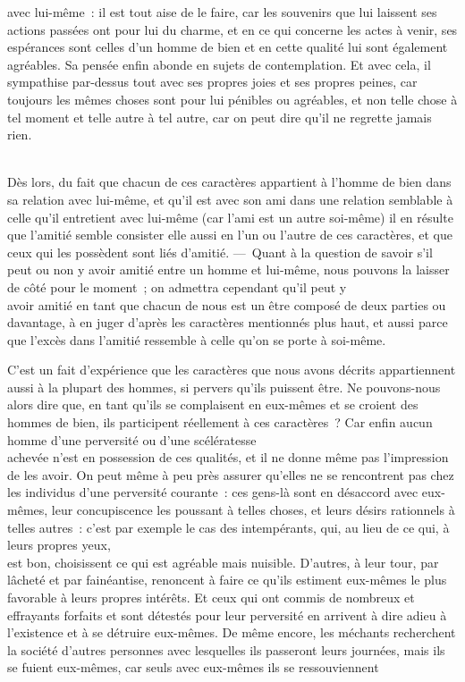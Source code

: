 \documentclass[french,twoside]{book} %
\begin{document}
avec lui-même : il est tout aise de le faire, car les souvenirs que lui laissent ses actions passées ont pour lui du charme, et en ce qui concerne les actes à venir, ses espérances sont celles d’un homme de bien et en cette qualité lui sont également agréables. Sa pensée enfin abonde en sujets de contemplation. Et avec cela, il sympathise par-dessus tout avec ses propres joies et ses propres peines, car toujours les mêmes choses sont pour lui pénibles ou agréables, et non telle chose à tel moment et telle autre à tel autre, car on peut dire qu’il ne regrette jamais rien.\par
\\
Dès lors, du fait que chacun de ces caractères appartient à l’homme de bien dans sa relation avec lui-même, et qu’il est avec son ami dans une relation semblable à celle qu’il entretient avec lui-même (car l’ami est un autre soi-même) il en résulte que l’amitié semble consister elle aussi en l’un ou l’autre de ces caractères, et que ceux qui les possèdent sont liés d’amitié. — Quant à la question de savoir s’il peut ou non y avoir amitié entre un homme et lui-même, nous pouvons la laisser de côté pour le moment ; on admettra cependant qu’il peut y \\
avoir amitié en tant que chacun de nous est un être composé de deux parties ou davantage, à en juger d’après les caractères  mentionnés plus haut, et aussi parce que l’excès dans l’amitié ressemble à celle qu’on se porte à soi-même.\par
C’est un fait d’expérience que les caractères que nous avons décrits appartiennent aussi à la plupart des hommes, si pervers qu’ils puissent être. Ne pouvons-nous alors dire que, en tant qu’ils se complaisent en eux-mêmes et se croient des hommes de bien, ils participent réellement à ces caractères ? Car enfin aucun homme d’une perversité ou d’une scélératesse \\
achevée n’est en possession de ces qualités, et il ne donne même pas l’impression de les avoir. On peut même à peu près assurer qu’elles ne se rencontrent pas chez les individus d’une perversité courante : ces gens-là sont en désaccord avec eux-mêmes, leur concupiscence les poussant à telles choses, et leurs désirs rationnels à telles autres : c’est par exemple le cas des intempérants, qui, au lieu de ce qui, à leurs propres yeux, \\
est bon, choisissent ce qui est agréable mais nuisible. D’autres, à leur tour, par lâcheté et par fainéantise, renoncent à faire ce qu’ils estiment eux-mêmes le plus favorable à leurs propres intérêts. Et ceux qui ont commis de nombreux et effrayants forfaits et sont détestés pour leur perversité en arrivent à dire adieu à l’existence et à se détruire eux-mêmes. De même encore, les méchants recherchent la société d’autres personnes avec lesquelles ils passeront leurs journées, mais ils se fuient eux-mêmes, car seuls avec eux-mêmes ils se ressouviennent \\
\end{document}
